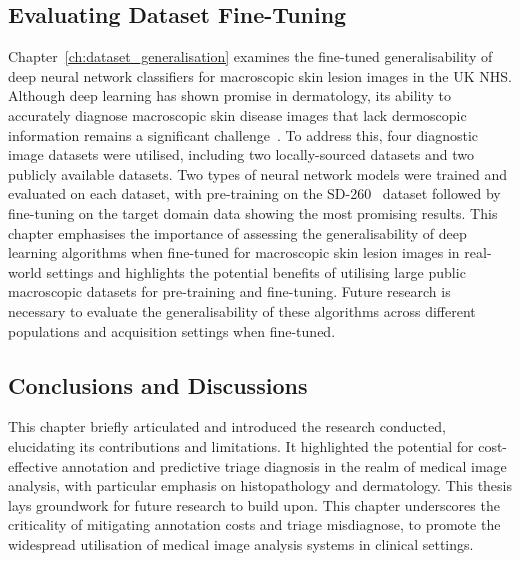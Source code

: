 \subsection*{Evaluating Dataset Fine-Tuning}
Chapter~\ref{ch:dataset_generalisation} examines the fine-tuned generalisability of deep neural network classifiers for macroscopic skin lesion images in the UK NHS. Although deep learning has shown promise in dermatology, its ability to accurately diagnose macroscopic skin disease images that lack dermoscopic information remains a significant challenge~\citep{jones2022artificial}. To address this, four diagnostic image datasets were utilised, including two locally-sourced datasets and two publicly available datasets. Two types of neural network models were trained and evaluated on each dataset, with pre-training on the SD-260~\citep{yang2019self} dataset followed by fine-tuning on the target domain data showing the most promising results. This chapter emphasises the importance of assessing the generalisability of deep learning algorithms when fine-tuned for macroscopic skin lesion images in real-world settings and highlights the potential benefits of utilising large public macroscopic datasets for pre-training and fine-tuning. Future research is necessary to evaluate the generalisability of these algorithms across different populations and acquisition settings when fine-tuned.

\subsection*{Conclusions and Discussions}
This chapter briefly articulated and introduced the research conducted, elucidating its contributions and limitations. It highlighted the potential for cost-effective annotation and predictive triage diagnosis in the realm of medical image analysis, with particular emphasis on histopathology and dermatology. This thesis lays groundwork for future research to build upon. This chapter underscores the criticality of mitigating annotation costs and triage misdiagnose, to promote the widespread utilisation of medical image analysis systems in clinical settings.